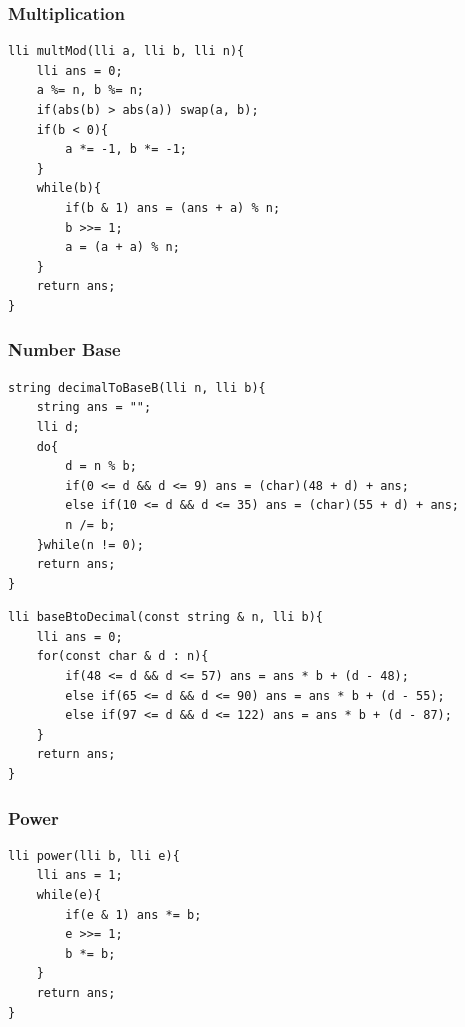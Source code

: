 \documentclass[twoside]{article}
\begin{document}
\begin{multicols*}{2}
\begin{verbatim}
\end{verbatim}

\subsubsectionfont{\large\bfseries\sffamily\underline}
\subsubsection*{Multiplication}
\begin{verbatim}
lli multMod(lli a, lli b, lli n){
	lli ans = 0;
	a %= n, b %= n;
	if(abs(b) > abs(a)) swap(a, b);
	if(b < 0){
		a *= -1, b *= -1;
	}
	while(b){
		if(b & 1) ans = (ans + a) % n;
		b >>= 1;
		a = (a + a) % n;
	}
	return ans;
}

\end{verbatim}

\subsubsectionfont{\large\bfseries\sffamily\underline}
\subsubsection*{Number Base}
\begin{verbatim}
string decimalToBaseB(lli n, lli b){
	string ans = "";
	lli d;
	do{
		d = n % b;
		if(0 <= d && d <= 9) ans = (char)(48 + d) + ans;
		else if(10 <= d && d <= 35) ans = (char)(55 + d) + ans;
		n /= b;
	}while(n != 0);
	return ans;
}

\end{verbatim}
\vspace{-12pt}
\begin{verbatim}
lli baseBtoDecimal(const string & n, lli b){
	lli ans = 0;
	for(const char & d : n){
		if(48 <= d && d <= 57) ans = ans * b + (d - 48);
		else if(65 <= d && d <= 90) ans = ans * b + (d - 55);
		else if(97 <= d && d <= 122) ans = ans * b + (d - 87);
	}
	return ans;
}

\end{verbatim}

\subsubsectionfont{\large\bfseries\sffamily\underline}
\subsubsection*{Power}
\begin{verbatim}
lli power(lli b, lli e){
	lli ans = 1;
	while(e){
		if(e & 1) ans *= b;
		e >>= 1;
		b *= b;
	}
	return ans;
}


\end{verbatim}
\end{multicols*}
\end{document}
